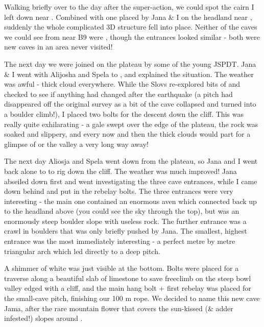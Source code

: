 
Walking briefly over to  the day after the super-action, we could spot
the cairn I left down near . Combined with one placed by
Jana \& I on the headland near , suddenly the whole complicated 3D
structure fell into place. Neither of the caves we could see from near
B9 were , though the entrances looked similar - both
were new caves in an area never visited!

The next day we were joined on the plateau by some of the young JSPDT.
Jana \& I went with Alijosha and Spela to , and explained the
situation. The weather was awful - thick cloud everywhere. While the
Slovs re-explored bits of  and checked to see if anything had changed
after the earthquake (a pitch had disappeared off the original survey as
a bit of the cave collapsed and turned into a boulder climb!), I placed
two bolts for the descent down the cliff. This was really quite
exhilarating - a gale swept over the edge of the plateau, the rock was
soaked and slippery, and every now and then the thick clouds would part
for a glimpse of  or the  valley a very long way away!

The next day Aliosja and Spela went down from the plateau, so Jana and I
went back alone to  to rig down the cliff. The weather was much
improved! Jana abseiled down first and went investigating the three cave
entrances, while I came down behind and put in the rebelay bolts. The
three entrances were very interesting - the main one contained an
enormous aven which connected back up to the headland above  (you
could see the sky through the top), but was an enormously steep boulder
slope with useless rock. The further entrance was a crawl in boulders
that was only briefly pushed by Jana. The smallest, highest entrance was
the most immediately interesting - a perfect metre by metre triangular
arch which led directly to a deep pitch. 

A shimmer of white was just
visible at the bottom. Bolts were placed for a traverse along a
beautiful slab of limestone to save freeclimb on the steep bowl valley
edged with a cliff, and the main hang bolt + first rebelay was placed
for the small-cave pitch, finishing our 100 m rope. We decided to name
this new cave  Jama, after the rare mountain flower that covers
the sun-kissed (\& adder infested!) slopes around .

